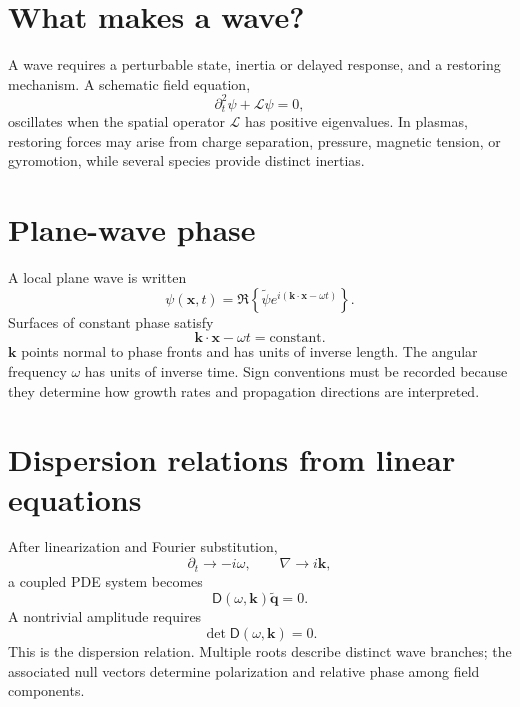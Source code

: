 \documentclass[11pt]{article}
\begin{document}
\section{What makes a wave?}

A wave requires a perturbable state, inertia or delayed response, and a restoring mechanism. A schematic field equation,
\begin{equation}
\partial_t^2\psi+\mathcal L\psi=0,
\end{equation}
oscillates when the spatial operator $\mathcal L$ has positive eigenvalues. In plasmas, restoring forces may arise from charge separation, pressure, magnetic tension, or gyromotion, while several species provide distinct inertias.


\section{Plane-wave phase}

A local plane wave is written
\begin{equation}
\psi(\mathbf x,t)=\Re\left\{\tilde\psi
e^{i(\mathbf k\cdot\mathbf x-\omega t)}\right\}.
\end{equation}
Surfaces of constant phase satisfy
\begin{equation}
\mathbf k\cdot\mathbf x-\omega t=\text{constant}.
\end{equation}
$\mathbf k$ points normal to phase fronts and has units of inverse length. The angular frequency $\omega$ has units of inverse time. Sign conventions must be recorded because they determine how growth rates and propagation directions are interpreted.


\section{Dispersion relations from linear equations}

After linearization and Fourier substitution,
\begin{equation}
\partial_t\rightarrow-i\omega,\qquad
\nabla\rightarrow i\mathbf k,
\end{equation}
a coupled PDE system becomes
\begin{equation}
\mathsf D(\omega,\mathbf k)\tilde{\mathbf q}=0.
\end{equation}
A nontrivial amplitude requires
\begin{equation}
\boxed{\det\mathsf D(\omega,\mathbf k)=0}.
\end{equation}
This is the dispersion relation. Multiple roots describe distinct wave branches; the associated null vectors determine polarization and relative phase among field components.
\end{document}
